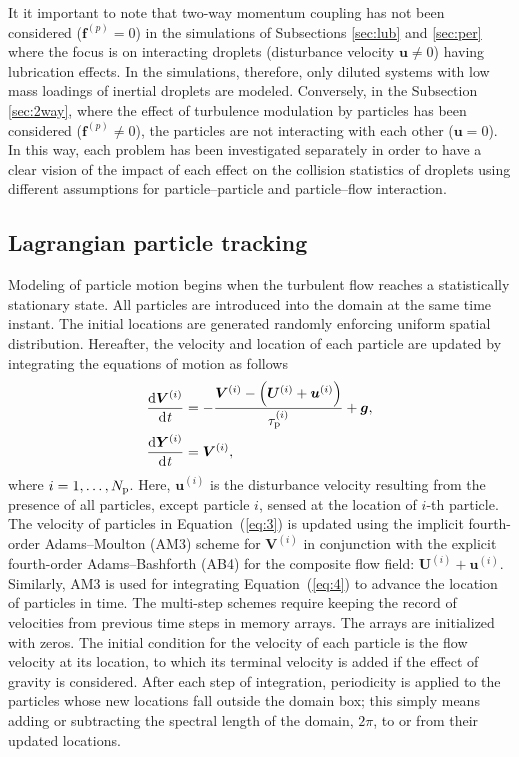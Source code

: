\documentclass[../thesis.tex]{subfiles}
\begin{document}
It it important to note that two-way momentum coupling has not been considered ($\boldsymbol{f}^{(p)} = 0$) in the simulations of Subsections \ref{sec:lub} and \ref{sec:per} where the focus is on interacting droplets (disturbance velocity $\boldsymbol{u} \neq 0$) having lubrication effects. In the simulations, therefore, only diluted systems with low mass loadings of inertial droplets are modeled. Conversely, in the Subsection \ref{sec:2way}, where the effect of turbulence modulation by particles has been considered ($\boldsymbol{f}^{(p)} \neq 0$), the particles are not interacting with each other ($\boldsymbol{u} = 0$). In this way, each problem has been investigated separately in order to have a clear vision of the impact of each effect on the collision statistics of droplets using different assumptions for particle--particle and particle--flow interaction. 



\subsection{Lagrangian particle tracking}
Modeling of particle motion begins when the turbulent flow reaches a statistically stationary state. All particles are introduced into the domain at the same time instant. The initial locations are generated randomly enforcing uniform spatial distribution. Hereafter, the velocity and location of each particle are updated by integrating the equations of motion \citep{MR83} as follows
\begin{align}
\frac{\mathrm d \boldsymbol{V}^{(i)}}{\mathrm d \it t}&=-\frac{\boldsymbol{V}^{(i)}-\Big(\boldsymbol U^{(i)}+\boldsymbol{u}^{(i)}\Big)}{\tau_{\text p}^{(i)}}+\boldsymbol{g}\label{eq:3},\\
\frac{\mathrm d \boldsymbol{Y}^{(i)}}{\mathrm d \it t}&=\boldsymbol{V}^{(i)} \label{eq:4},
\end{align}
where $i=1,\dots, N_{\text p}$. Here, $\boldsymbol{u}^{(i)}$ is the disturbance velocity resulting from the presence of all particles, except particle $i$, sensed at the location of $i$-th particle. The velocity of particles in Equation~(\ref{eq:3}) is updated using the implicit fourth-order Adams--Moulton (AM3) scheme for $\boldsymbol{V}^{(i)}$ in conjunction with the explicit fourth-order Adams--Bashforth (AB4) for the composite flow field: $\boldsymbol{U}^{(i)}+\boldsymbol{u}^{(i)}$. Similarly, AM3 is used for integrating Equation~(\ref{eq:4}) to advance the location of particles in time. The multi-step schemes require keeping the record of velocities from previous time steps in memory arrays. The arrays are initialized with zeros. The initial condition for the velocity of each particle is the flow velocity at its location, to which its terminal velocity is added if the effect of gravity is considered. After each step of integration, periodicity is applied to the particles whose new locations fall outside the domain box; this simply means adding or subtracting the spectral length of the domain, $2\pi$, to or from their updated locations.
\end{document}
